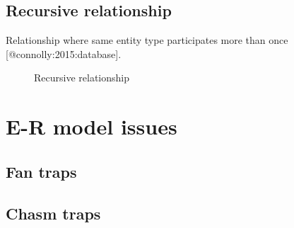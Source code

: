 \documentclass[slides]{pgnotes}
\begin{document}
\subsection{Recursive relationship}\label{recursive-relationship}

Relationship where same entity type participates more than once
{[}@connolly:2015:database{]}.

\begin{figure}[htbp]
  \centering
  \caption{Recursive relationship{}}
\end{figure}

\section{E-R model issues}\label{e-r-model-issues}

\subsection{Fan traps}\label{fan-traps}

\subsection{Chasm traps}\label{chasm-traps}
\end{document}
